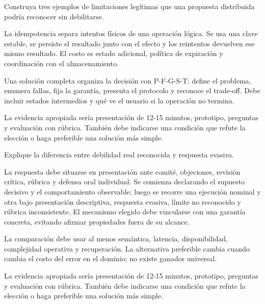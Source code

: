 \documentclass[variant=guia,cover=institutional,mode=screen]{ua-engineering-v6-article}
\begin{document}
\begin{uaexercise}
Construya tres ejemplos de limitaciones legítimas que una propuesta distribuida podría reconocer sin debilitarse.
\end{uaexercise}
\begin{uaanswer}
La idempotencia separa intentos físicos de una operación lógica. Se usa una clave estable, se persiste el resultado junto con el efecto y los reintentos devuelven ese mismo resultado. El costo es estado adicional, política de expiración y coordinación con el almacenamiento.

Una solución completa organiza la decisión con P-F-G-S-T: define el problema, enumera fallas, fija la garantía, presenta el protocolo y reconoce el trade-off. Debe incluir estados intermedios y qué ve el usuario si la operación no termina.

La evidencia apropiada sería presentación de 12-15 minutos, prototipo, preguntas y evaluación con rúbrica. También debe indicarse una condición que refute la elección o haga preferible una solución más simple.
\end{uaanswer}

\begin{uaexercise}
Explique la diferencia entre debilidad real reconocida y respuesta evasiva.
\end{uaexercise}
\begin{uaanswer}
La respuesta debe situarse en presentación ante comité, objeciones, revisión crítica, rúbrica y defensa oral individual. Se comienza declarando el supuesto decisivo y el comportamiento observable; luego se recorre una ejecución nominal y otra bajo presentación descriptiva, respuesta evasiva, límite no reconocido y rúbrica inconsistente. El mecanismo elegido debe vincularse con una garantía concreta, evitando afirmar propiedades fuera de su alcance.

La comparación debe usar al menos semántica, latencia, disponibilidad, complejidad operativa y recuperación. La alternativa preferible cambia cuando cambia el costo del error en el dominio; no existe ganador universal.

La evidencia apropiada sería presentación de 12-15 minutos, prototipo, preguntas y evaluación con rúbrica. También debe indicarse una condición que refute la elección o haga preferible una solución más simple.
\end{uaanswer}
\end{document}
